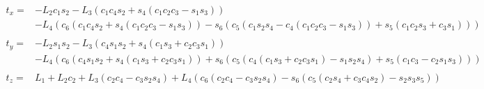 \begin{equation}
    \begin{split}
        t_x =& - L_{2} c_{1} s_{2} - L_{3} \left(c_{1} c_{4} s_{2} + s_{4} \left(c_{1} c_{2} c_{3} - s_{1} s_{3}\right)\right) \\
            &- L_{4} \left(c_{6} \left(c_{1} c_{4} s_{2} + s_{4} \left(c_{1} c_{2} c_{3} - s_{1} s_{3}\right)\right) - s_{6} \left(c_{5} \left(c_{1} s_{2} s_{4} - c_{4} \left(c_{1} c_{2} c_{3} - s_{1} s_{3}\right)\right) + s_{5} \left(c_{1} c_{2} s_{3} + c_{3} s_{1}\right)\right)\right) \\
        \\
        t_y =& - L_{2} s_{1} s_{2} - L_{3} \left(c_{4} s_{1} s_{2} + s_{4} \left(c_{1} s_{3} + c_{2} c_{3} s_{1}\right)\right) \\
            &- L_{4} \left(c_{6} \left(c_{4} s_{1} s_{2} + s_{4} \left(c_{1} s_{3} + c_{2} c_{3} s_{1}\right)\right) + s_{6} \left(c_{5} \left(c_{4} \left(c_{1} s_{3} + c_{2} c_{3} s_{1}\right) - s_{1} s_{2} s_{4}\right) + s_{5} \left(c_{1} c_{3} - c_{2} s_{1} s_{3}\right)\right)\right) \\
        \\
        t_z =& L_{1} + L_{2} c_{2} + L_{3} \left(c_{2} c_{4} - c_{3} s_{2} s_{4}\right) + L_{4} \left(c_{6} \left(c_{2} c_{4} - c_{3} s_{2} s_{4}\right) - s_{6} \left(c_{5} \left(c_{2} s_{4} + c_{3} c_{4} s_{2}\right) - s_{2} s_{3} s_{5}\right)\right)
    \end{split}
    \label{eq:app-7r-tooltip-tf-trans-vals}
\end{equation}

